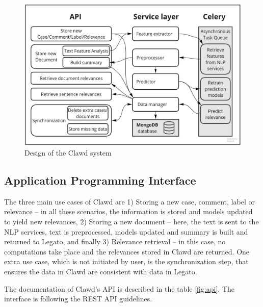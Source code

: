 \documentclass[
  digital, %
  notable,   %
  nolof,     %
  nolot,     %
]{fithesis3}
\begin{document}
\begin{figure}[h]
\caption{Design of the Clawd system}
\label{fig:Design}
\includegraphics[width=\textwidth]{img/Design}
\end{figure}

\subsection{Application Programming Interface}
\label{sec:api}
The three main use cases of Clawd are 1) Storing a new case, comment, label or relevance -- in all these scenarios, the information is stored and models updated to yield new relevances, 2) Storing a new document -- here, the text is sent to the NLP services, text is preprocessed, models updated and summary is built and returned to Legato, and finally 3) Relevance retrieval -- in this case, no computations take place and the relevances stored in Clawd are returned.
One extra use case, which is not initiated by user, is the synchronization step, that ensures the data in Clawd are consistent with data in Legato.

The documentation of Clawd's API is described in the table \ref{fig:api}.
The interface is following the REST API guidelines.
\end{document}
